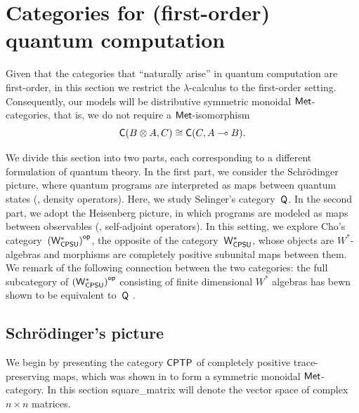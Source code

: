 \section{Categories for (first-order) quantum computation} \label{sec:quantum_cats}

Given that the categories that ``naturally arise'' in quantum computation are first-order, in this section we restrict the $\lambda$-calculus to the first-order setting. Consequently, our models will be distributive symmetric monoidal $\mathsf{Met}$-categories, that is, we do not require a $\mathsf{Met}$-isomorphism
\[
  \mathsf{C}(B \otimes A, C) \cong \mathsf{C}(C, A \multimap B).
\]




We divide this section into two parts, each corresponding to a different formulation of quantum theory. In the first part, we consider the Schr\"odinger picture, where quantum programs are interpreted as maps between quantum states (\ie, density operators). Here, we study Selinger's category~$\mathsf{Q}$.
In the second part, we adopt the Heisenberg picture, in which programs are modeled as maps between observables (\ie, self-adjoint operators). In this setting, we explore Cho's category~$\left(\mathsf{W^*_{CPSU}}\right)^{\mathsf{op}}$, the opposite of the category~$\mathsf{W^*_{CPSU}}$, whose objects are \( W^* \)-algebras and morphisms are completely positive subunital maps between them. 
We remark of the following connection between the two categories: the full subcategory of $\left(\mathsf{W^*_{CPSU}}\right)^{\mathsf{op}}$ consisting of finite dimensional \( W^* \) algebras has bewn shown to be equivalent to~$\mathsf{Q}$ \cite{choSemanticsQuantumProgramming2016}.


\subsection{Schrödinger's picture}

We begin by presenting the category $\mathsf{CPTP}$ of completely positive trace-preserving maps, which was shown in \cite{dahlqvist2023syntactic} to form a symmetric monoidal $\mathsf{Met}$-category. In this section \gls{square_matrix} will denote the vector space of complex $n\times n$ matrices.

